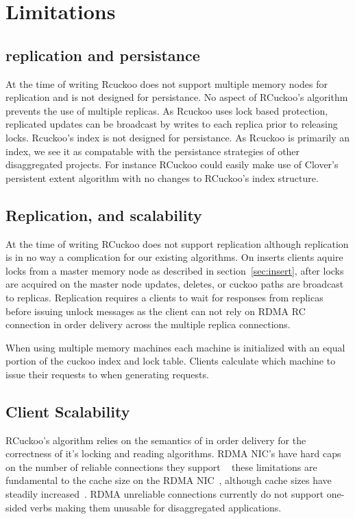 \section{Limitations}
\label{sec:limations}

\subsection{replication and persistance}
At the time of writing Rcuckoo does not support multiple
memory nodes for replication and is not designed for
persistance. No aspect of RCuckoo's algorithm prevents the
use of multiple replicas. As Rcuckoo uses lock based
protection, replicated updates can be broadcast by writes to
each replica prior to releasing locks. Rcuckoo's index is
not designed for persistance. As Rcuckoo is primarily an
index, we see it as compatable with the persistance
strategies of other disaggregated projects. For instance
RCuckoo could easily make use of Clover's persistent extent
algorithm with no changes to RCuckoo's index structure.

\subsection{Replication, and scalability} 
 At the time of writing RCuckoo
does not support replication although replication is in no
way a complication for our existing algorithms. On inserts
clients aquire locks from a master memory node as described
in section~\ref{sec:insert}, after locks are acquired on the
master node updates, deletes, or cuckoo paths are broadcast
to replicas. Replication requires a clients to wait for
responses from replicas before issuing unlock messages as
the client can not rely on RDMA RC connection in order
delivery across the multiple replica connections.

 When using
multiple memory machines each machine is initialized with an
equal portion of the cuckoo index and lock table. Clients
calculate which machine to issue their requests to when
generating requests.


\subsection{Client Scalability} RCuckoo's algorithm relies
on the semantics of in order delivery for the correctness of
it's locking and reading algorithms. RDMA NIC's have hard
caps on the number of reliable connections they support
~ these limitations are fundamental to the
cache size on the RDMA NIC~\cite{erpc,faast}, although cache
sizes have steadily increased~\cite{storm}. RDMA unreliable
connections currently do not support one-sided verbs making
them unusable for disaggregated applications.
